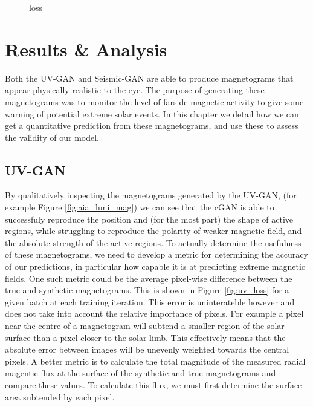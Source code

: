 \documentclass[11pt,a4paper,onecolumn]{report}
\begin{document}
\begin{figure}[htbp]
  \centering
  
  \caption{loss}
  \label{fig:seismic_loss}
\end{figure}

%
%
%
%
%
%
%
%
\chapter{Results \& Analysis}
%
%
%
%
%
%
\label{chap:results_and_analysis}

Both the UV-GAN and Seismic-GAN are able to produce magnetograms that appear
physically realistic to the eye. The purpose of generating these magnetograms was
to monitor the level of farside magnetic activity to give some warning of
potential extreme solar events. In this chapter we detail how we can get a
quantitative prediction from these magnetograms, and use these to assess the
validity of our model. 

\section{UV-GAN}
By qualitatively inspecting the magnetograms generated by the UV-GAN, (for
example Figure \ref{fig:aia_hmi_mag}) we can see that the cGAN is able to
successfuly reproduce the position and (for the most part) the shape of active
regions, while struggling to reproduce the polarity of weaker magnetic field,
and the absolute strength of the active regions. To actually determine the
usefulness of these magnetograms, we need to develop a metric for determining
the accuracy of our predictions, in particular how capable it is at predicting
extreme magnetic fields. One such metric could be the average pixel-wise
difference between the true and synthetic magnetograms. This is shown in Figure
\ref{fig:uv_loss} for a given batch at each training iteration. This error is
uninterateble however and does not take into account the relative importance of
pixels. For example a pixel near the centre of a magnetogram will subtend a
smaller region of the solar surface than a pixel closer to the solar limb. This
effectively means that the absolute error between images will be unevenly
weighted towards the central pixels. A better metric is to calculate the total
magnitude of the measured radial magentic flux at the surface of the synthetic
and true magnetograms and compare these values. To calculate this flux, we must
first determine the surface area subtended by each pixel.\\
\end{document}
